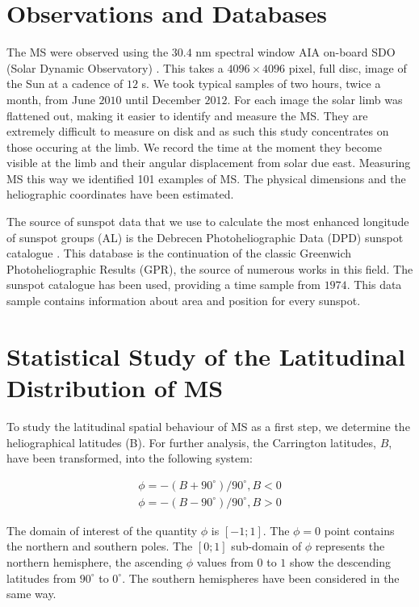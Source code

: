 \section{Observations and Databases}
The MS were observed using the $30.4$ nm spectral window AIA on-board SDO (Solar Dynamic Observatory) \cite{AIAspec}. This takes a $4096 \times 4096$ pixel, full disc, image of the Sun at a cadence of $12$ s. We took typical samples of two hours, twice a month, from June $2010$ until December $2012$. For each image the solar limb was flattened out, making it easier to identify and measure the MS. They are extremely difficult to measure on disk and as such this study concentrates on those occuring at the limb. We record the time at the moment they become visible at the limb and their angular displacement from solar due east. Measuring MS this way we identified 101 examples of MS. The physical dimensions and the heliographic coordinates have been estimated. 

The source of sunspot data that we use to calculate the most enhanced longitude of sunspot groups (AL) is the Debrecen Photoheliographic Data (DPD) sunspot catalogue \cite{Gyori2011}. This database is the continuation of the classic Greenwich Photoheliographic Results (GPR), the source of numerous works in this field. The sunspot catalogue has been used, providing a time sample from $1974$. This data sample contains information about area and position for every sunspot.

\section{Statistical Study of the Latitudinal Distribution of MS}
To study the latitudinal spatial behaviour of MS as a first step, we determine the heliographical latitudes (B). For further analysis, the Carrington latitudes, $B$, have been transformed, into the following system:

\begin{equation}
\begin{split}
\phi=-(B+90^{\circ})/90^{\circ},  B<0 \\
\phi=-(B-90^{\circ})/90^{\circ},  B>0
\end{split}
\end{equation}

The domain of interest of the quantity $\phi$ is $[-1;1]$. The $\phi=0$ point contains the northern and southern poles. The $[0;1]$ sub-domain of $\phi$ represents the northern hemisphere, the ascending $\phi$ values from $0$ to $1$ show the descending latitudes from $90^{\circ}$ to $0^{\circ}$. The southern hemispheres have been considered in the same way.

